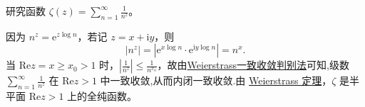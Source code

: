 \documentclass[../../main.tex]{subfiles}
\begin{document}
\begin{example}
研究函数 \( \zeta(z) = \sum_{n=1}^{\infty} \frac{1}{n^z} \)。
\end{example}
\begin{solution}
因为 \( n^z = \mathrm{e}^{z \log n} \)，若记 \( z = x + \mathrm{i}y \)，则
\[
|n^z| = |\mathrm{e}^{x \log n} \cdot \mathrm{e}^{\mathrm{i}y \log n}| = n^x.
\]
当 \( \mathrm{Re}z = x \geqslant x_0 > 1 \) 时，\( \left| \frac{1}{n^z} \right| \leqslant \frac{1}{n^{x_0}} \)，故由\hyperref[theorem:Weierstrass一致收敛判别法]{Weierstrass一致收敛判别法}可知,级数 \( \sum_{n=1}^{\infty} \frac{1}{n^z} \) 在 \( \mathrm{Re}z > 1 \) 中一致收敛,从而内闭一致收敛.由 \hyperref[theorem:Weierstrass定理]{Weierstrass 定理}，\( \zeta \) 是半平面 \( \mathrm{Re}z > 1 \) 上的全纯函数。
\end{solution}
\end{document}
